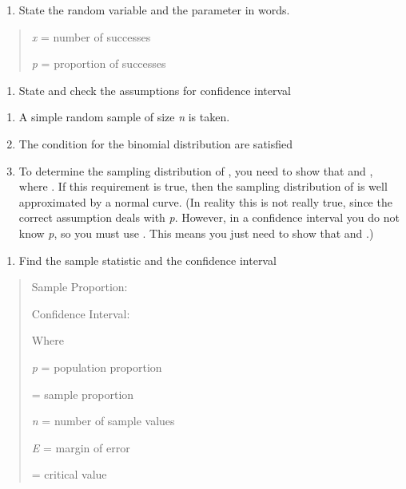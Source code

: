 \documentclass[]{book}
\providecommand{\tightlist}{%
  \setlength{\itemsep}{0pt}\setlength{\parskip}{0pt}}
\begin{document}
\begin{enumerate}
\def\labelenumi{\arabic{enumi}.}
\tightlist
\item
  State the random variable and the parameter in words.
\end{enumerate}

\begin{quote}
\emph{x} = number of successes

\emph{p} = proportion of successes
\end{quote}

\begin{enumerate}
\def\labelenumi{\arabic{enumi}.}
\setcounter{enumi}{1}
\tightlist
\item
  State and check the assumptions for confidence interval
\end{enumerate}

\begin{enumerate}
\def\labelenumi{\alph{enumi}.}
\item
  A simple random sample of size \emph{n} is taken.
\item
  The condition for the binomial distribution are satisfied
\item
  To determine the sampling distribution of , you need to show that
  and , where . If this requirement is true, then the sampling
  distribution of is well approximated by a normal curve. (In reality
  this is not really true, since the correct assumption deals with
  \emph{p}. However, in a confidence interval you do not know \emph{p}, so you
  must use . This means you just need to show that and .)
\end{enumerate}

\begin{enumerate}
\def\labelenumi{\arabic{enumi}.}
\setcounter{enumi}{2}
\tightlist
\item
  Find the sample statistic and the confidence interval
\end{enumerate}

\begin{quote}
Sample Proportion:

Confidence Interval:

Where

\emph{p} = population proportion

= sample proportion

\emph{n} = number of sample values

\emph{E} = margin of error

= critical value
\end{quote}
\end{document}
